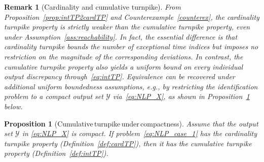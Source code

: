 \documentclass[a4paper,fleqn]{cas-dc}
\newtheorem{prop}{Proposition}
\newtheorem{rem}{Remark}
\begin{document}
\begin{rem}[Cardinality and cumulative turnpike]\label{rem:cardTP_converse}
	From Proposition~\ref{prop:intTP2cardTP} and Counterexample~\ref{counterex}, the cardinality turnpike property is strictly weaker than the cumulative turnpike property, even under Assumption~\ref{ass:reachability}.
	In fact, the essential difference is that cardinality turnpike bounds the number of exceptional time indices but imposes no restriction on the magnitude of the corresponding deviations. In contrast, the cumulative turnpike property also yields a uniform bound on every individual output discrepancy through~\eqref{eq:intTP}.
	Equivalence can be recovered under additional uniform boundedness assumptions, e.g., by restricting the identification problem to a compact output set $\mathcal{Y}$ via~\eqref{eq:NLP_X}, as shown in Proposition~\ref{prop:cardTP2intTP} below.
\end{rem}

\begin{prop}[Cumulative{\,}turnpike{\,}under{\,}compactness]
	\label{prop:cardTP2intTP}
	Assume that the output set $\mathcal{Y}$ in \eqref{eq:NLP_X} is compact.
	If problem~\eqref{eq:NLP_case_1} has the cardinality turnpike property (Definition~\ref{def:cardTP}), then it has the cumulative turnpike property (Definition~\ref{def:intTP}).
\end{prop}
\end{document}
